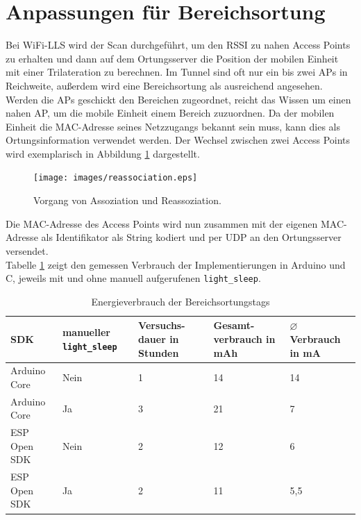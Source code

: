 







\section{Anpassungen für Bereichsortung}
\label{ch:phase1:sec:anpassungbereich}
Bei WiFi-LLS wird der Scan durchgeführt, um den RSSI zu nahen Access Points zu erhalten und dann auf dem Ortungsserver die Position der mobilen Einheit mit einer Trilateration zu berechnen.
Im Tunnel sind oft nur ein bis zwei APs in Reichweite, außerdem wird eine Bereichsortung als ausreichend angesehen. \\
Werden die APs geschickt den Bereichen zugeordnet, reicht das Wissen um einen nahen AP, um die mobile Einheit einem Bereich zuzuordnen.
Da der mobilen Einheit die MAC-Adresse seines Netzzugangs bekannt sein muss, kann dies als Ortungsinformation verwendet werden.
Der Wechsel zwischen zwei Access Points wird exemplarisch in Abbildung \ref{fig:reassociation} dargestellt.

\begin{figure}[h!]
  \centering
	\texttt{[image: images/reassociation.eps]}
  \caption{Vorgang von Assoziation und Reassoziation.}
  \label{fig:reassociation}
\end{figure}

Die MAC-Adresse des Access Points wird nun zusammen mit der eigenen MAC-Adresse als Identifikator als String kodiert und per UDP an den Ortungsserver versendet.\\
Tabelle \ref{table:naiveconsumption} zeigt den gemessen Verbrauch der Implementierungen in Arduino und C, jeweils mit und ohne manuell aufgerufenen \texttt{light\_sleep}.

\begin{table}[h]
	\centering
	\caption{Energieverbrauch der Bereichsortungstags}
	\label{table:naiveconsumption}
	\begin{tabular}{p{3cm}|p{2.2cm}|p{1.7cm}|p{2.5cm}|p{2.5cm}}
		SDK & manueller \texttt{light\_sleep} & Versuchs-dauer in Stunden & Gesamt-verbrauch in mAh & $\varnothing$ Verbrauch in mA \\
		\hline
		Arduino Core & Nein & 1 & 14 & 14 \\
		Arduino Core & Ja & 3 & 21 & 7 \\
		ESP Open SDK & Nein & 2 & 12 & 6 \\
		ESP Open SDK & Ja & 2 & 11 & 5,5 \\
	\end{tabular}
\end{table}

